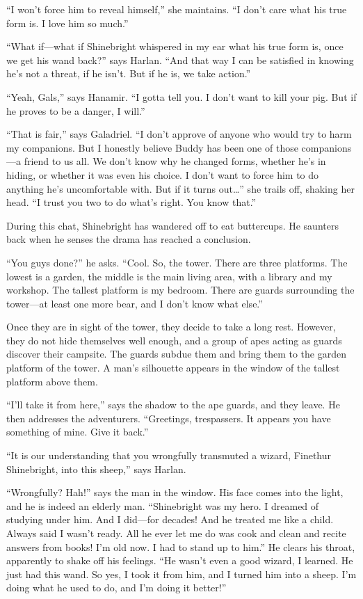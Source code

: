 \documentclass[smalldemyvopaper,11pt,twoside,onecolumn,openright,extrafontsizes]{memoir}
\begin{document}
``I won't force him to reveal himself,'' she maintains. ``I don't care
what his true form is. I love him so much.''

``What if---what if Shinebright whispered in my ear what his true form
is, once we get his wand back?'' says Harlan. ``And that way I can be
satisfied in knowing he's not a threat, if he isn't. But if he is, we
take action.''

``Yeah, Gals,'' says Hanamir. ``I gotta tell you. I don't want to kill
your pig. But if he proves to be a danger, I will.''

``That is fair,'' says Galadriel. ``I don't approve of anyone who would
try to harm my companions. But I honestly believe Buddy has been one of
those companions---a friend to us all. We don't know why he changed
forms, whether he's in hiding, or whether it was even his choice. I
don't want to force him to do anything he's uncomfortable with. But if
it turns out\ldots{}'' she trails off, shaking her head. ``I trust you
two to do what's right. You know that.''

During this chat, Shinebright has wandered off to eat buttercups. He
saunters back when he senses the drama has reached a conclusion.

``You guys done?'' he asks. ``Cool. So, the tower. There are three
platforms. The lowest is a garden, the middle is the main living area,
with a library and my workshop. The tallest platform is my bedroom.
There are guards surrounding the tower---at least one more bear, and I
don't know what else.''

Once they are in sight of the tower, they decide to take a long rest.
However, they do not hide themselves well enough, and a group of apes
acting as guards discover their campsite. The guards subdue them and
bring them to the garden platform of the tower. A man's silhouette
appears in the window of the tallest platform above them.

``I'll take it from here,'' says the shadow to the ape guards, and they
leave. He then addresses the adventurers. ``Greetings, trespassers. It
appears you have something of mine. Give it back.''

``It is our understanding that you wrongfully transmuted a wizard,
Finethur Shinebright, into this sheep,'' says Harlan.

``Wrongfully? Hah!'' says the man in the window. His face comes into the
light, and he is indeed an elderly man. ``Shinebright was my hero. I
dreamed of studying under him. And I did---for decades! And he treated
me like a child. Always said I wasn't ready. All he ever let me do was
cook and clean and recite answers from books! I'm old now. I had to
stand up to him.'' He clears his throat, apparently to shake off his
feelings. ``He wasn't even a good wizard, I learned. He just had this
wand. So yes, I took it from him, and I turned him into a sheep. I'm
doing what he used to do, and I'm doing it better!''
\end{document}
